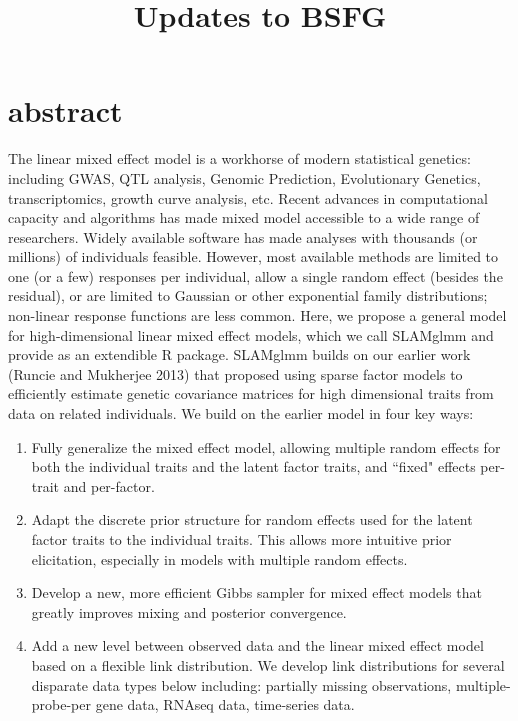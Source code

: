 \documentclass[11pt]{amsart}
\title{Updates to BSFG}                %
\begin{document}
\maketitle
\tableofcontents
\label{TOC}

\section{abstract}
The linear mixed effect model is a workhorse of modern statistical genetics: including GWAS, QTL analysis, Genomic Prediction, Evolutionary Genetics, transcriptomics, growth curve analysis, etc. 
Recent advances in computational capacity and algorithms has made mixed model accessible to a wide range of researchers.
Widely available software has made analyses with thousands (or millions) of individuals feasible. However, most
available methods are limited to one (or a few) responses per individual, allow a single random effect (besides the residual), or are limited to Gaussian or other exponential family distributions; non-linear response functions are less common. Here, we propose a general model for high-dimensional linear mixed effect models, which we call SLAMglmm and provide as an extendible R package. SLAMglmm builds on our earlier work (Runcie and Mukherjee 2013) that proposed using sparse factor models to efficiently estimate genetic covariance matrices for high dimensional traits from data on related individuals. We build on the earlier model in four key ways:

\begin{enumerate}
\item Fully generalize the mixed effect model, allowing multiple random effects for both the individual traits and the latent factor traits, and ``fixed" effects per-trait and per-factor.
\item Adapt the discrete prior structure for random effects used for the latent factor traits to the individual traits. This allows more intuitive prior elicitation, especially in models with multiple random effects.
\item Develop a new, more efficient Gibbs sampler for mixed effect models that greatly improves mixing and posterior convergence.
\item Add a new level between observed data and the linear mixed effect model based on a flexible link distribution. We develop link distributions for several disparate data types below including: partially missing observations, multiple-probe-per gene data, RNAseq data, time-series data.
\end{enumerate}
\end{document}
